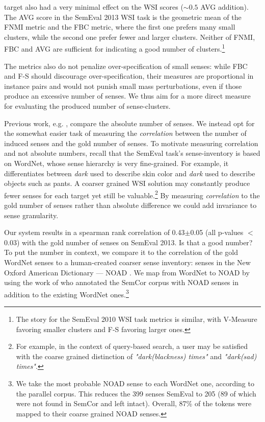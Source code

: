 \documentclass[11pt,a4paper]{article}
\begin{document}
target also had a very minimal effect on the WSI scores ($\sim0.5$ AVG addition). 
The AVG score in the SemEval 2013 WSI task is the geometric mean of the FNMI metric and the FBC metric, where the first one prefers many small clusters, while the second one prefer fewer and larger clusters. Neither of FNMI, FBC and AVG are sufficient for indicating a good number of clusters.\footnote{The story for the SemEval 2010 WSI task metrics is similar, with V-Measure favoring smaller clusters and F-S favoring larger ones.}

The metrics also do not penalize over-specification of small senses:
while FBC and F-S should discourage over-specification, their measures are proportional in instance pairs and would not punish small mass perturbations, even if those produce an excessive number of senses. We thus aim for a more direct measure for evaluating the produced number of sense-clusters.


Previous work, e.g. \cite{song2016word,hwang2019autosense}, compare the absolute number of senses. 
We instead opt for the somewhat easier task of measuring the \emph{correlation} between the number of induced senses and the gold number of senses. %
 To motivate measuring correlation and not absolute numbers, recall that the SemEval task's
sense-inventory is based on WordNet, whose sense hierarchy is very fine-grained.
For example, it differentiates between \emph{dark} used to describe skin color
and \emph{dark} used to describe objects such as pants. 
A coarser grained WSI solution may constantly produce fewer senses for each target yet still be valuable.\footnote{For example, in the context of query-based search, a user may be satisfied with the coarse grained distinction of \emph{"dark(blackness) times"} and \emph{"dark(sad) times"}. } By measuring \emph{correlation} to the gold number of senses rather than absolute difference we could add invariance to sense granularity.


Our system results in a spearman rank correlation of 0.43$\pm$0.05 (all p-values $<$ 0.03) with the gold number of senses on
SemEval 2013.
Is that a good number? To put the number in context, we compare it to the
correlation of the gold WordNet senses to a human-created coarser sense
inventory: senses in the New Oxford American Dictionary --- NOAD \citep{noad-dict}. We map from
WordNet to NOAD by using the work of \citet{naod} who annotated the SemCor
corpus with NOAD senses in addition to the existing WordNet ones.\footnote{We
take the most probable NOAD sense to each WordNet one, according to the
parallel corpus. This reduces the 399 senses SemEval to 205 (89 of which were
not found in SemCor and left intact). Overall, 87\% of the tokens were mapped to
their coarse grained NOAD senses.}
\end{document}
